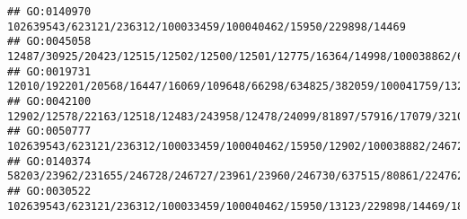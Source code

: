 \documentclass[
]{article}
\begin{document}
\begin{verbatim}
## GO:0140970                                                                                                                                                                                                                                                                                                                                               102639543/623121/236312/100033459/100040462/15950/229898/14469
## GO:0045058                                                                                                                                                                                                                                                                                                                     12487/30925/20423/12515/12502/12500/12501/12775/16364/14998/100038862/624681/16149/20371
## GO:0019731                                                                                                                                                                                                                                                                                   12010/192201/20568/16447/16069/109648/66298/634825/382059/100041759/13237/13239/626682/626708/100041952/503491/66107/78416
## GO:0042100                                                                                                                                                                                                                                                                                                     12902/12578/22163/12518/12483/243958/12478/24099/81897/57916/17079/321019/72049/208154/69816/16149/12229
## GO:0050777                                                                                                                                                                                                                                 102639543/623121/236312/100033459/100040462/15950/12902/100038882/246727/23961/23960/246730/109648/80782/12515/16643/434341/16160/80861/547253/57757/21354/21355/60533/20371
## GO:0140374                                                                                                                                                                                                                                                                                                                   58203/23962/231655/246728/246727/23961/23960/246730/637515/80861/224762/15958/15959/667370
## GO:0030522                                                                                                                                                                         102639543/623121/236312/100033459/100040462/15950/13123/229898/14469/18124/231655/246727/23961/23960/246730/20128/54123/234311/81897/327957/637515/80861/382551/58185/218772/18095/22337/54483/21380/15511/224762/224840/71398/12229

\end{verbatim}
\end{document}
